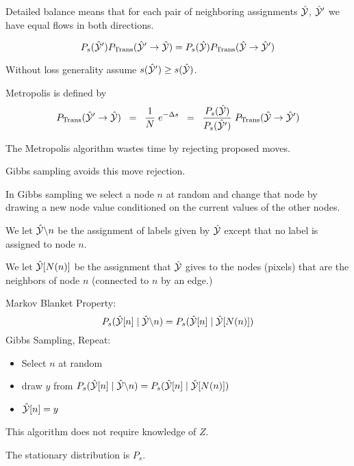 {

Detailed balance means that for each pair of neighboring assignments $\hat{\cal Y}$, $\hat{\cal Y}'$ we have equal flows in both directions.

\vfill
$$P_s(\hat{\cal Y}')P_{\mathrm{Trans}}(\hat{\cal Y}' \rightarrow \hat{\cal Y}) = P_s(\hat{\cal Y})P_{\mathrm{Trans}}(\hat{\cal Y} \rightarrow \hat{\cal Y}')$$

\vfill
Without loss generality assume $s(\hat{\cal Y}') \geq s(\hat{\cal Y})$.

\vfill
Metropolis is defined by
{\huge $$P_{\mathrm{Trans}}(\hat{\cal Y}' \rightarrow \hat{\cal Y}) \;\; = \;\; \frac{1}{N}\;e^{-\Delta s}
\;\;= \;\;\frac{P_s(\hat{\cal Y})}{P_s(\hat{\cal Y}')}\;P_{\mathrm{Trans}}(\hat{\cal Y} \rightarrow \hat{\cal Y}')$$}


The Metropolis algorithm wastes time by rejecting proposed moves.

\vfill
Gibbs sampling avoids this move rejection.

\vfill
In Gibbs sampling we select a node $n$ at random and change that node by drawing a new node value conditioned on the current values of the other nodes.

\vfill
We let {\color{red} $\hat{\cal Y} \backslash n$} be the assignment of labels given by $\hat{\cal Y}$ except that no label is assigned to node $n$.

\vfill
We let {\color{red} $\hat{\cal Y}[N(n)]$} be the assignment that $\hat{\cal Y}$ gives to the nodes (pixels) that are the neighbors of node $n$ (connected to $n$ by an edge.)


Markov Blanket Property:
{\color{red} $$P_s(\hat{\cal Y}[n] \;|\;\hat{\cal Y} \backslash n) = P_s(\hat{\cal Y}[n] \;|\; \hat{\cal Y}[N(n)])$$}
\vfill
Gibbs Sampling, Repeat:

\begin{itemize}
\item   Select $n$ at random

\item {\color{red} draw $y$ from $P_s(\hat{\cal Y}[n]\;|\;\hat{\cal Y} \backslash n) = P_s(\hat{\cal Y}[n] \;|\;\hat{\cal Y}[N(n)])$}

\item $\hat{\cal Y}[n] = y$
\end{itemize}

\vfill
This algorithm does not require knowledge of $Z$.

\vfill
The stationary distribution is $P_s$.


}


